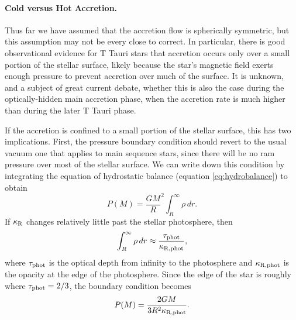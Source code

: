 \paragraph{Cold versus Hot Accretion.} Thus far we have assumed that the accretion flow is spherically symmetric, but this assumption may not be every close to correct. In particular, there is good observational evidence for T Tauri stars that accretion occurs only over a small portion of the stellar surface, likely because the star's magnetic field exerts enough pressure to prevent accretion over much of the surface. It is unknown, and a subject of great current debate, whether this is also the case during the optically-hidden main accretion phase, when the accretion rate is much higher than during the later T Tauri phase.

If the accretion is confined to a small portion of the stellar surface, this has two implications. First, the pressure boundary condition should revert to the usual vacuum one that applies to main sequence stars, since there will be no ram pressure over most of the stellar surface. We can write down this condition by integrating the equation of hydrostatic balance (equation \ref{eq:hydrobalance}) to obtain 
\begin{equation}
P(M) = \frac{G M}{R}^2 \int_{R}^{\infty} \rho \, dr.
\end{equation}
If $\kappa_{\rm R}$ changes relatively little past the stellar photosphere, then 
\begin{equation}
\int _{R}^{\infty} \rho \, dr \approx \frac{\tau_{\rm phot}}{\kappa_{\rm R, phot}},
\end{equation}
where $\tau_{\rm phot}$ is the optical depth from infinity to the photosphere and $\kappa_{\rm R, phot}$ is the opacity at the edge of the photosphere. Since the edge of the star is roughly where $\tau_{\rm phot} = 2/3$, the boundary condition becomes
\begin{equation}
\label{pbound2}
P(M) = \frac{2 G M}{3 R^2 \kappa_{\rm R, phot}}.
\end{equation}
